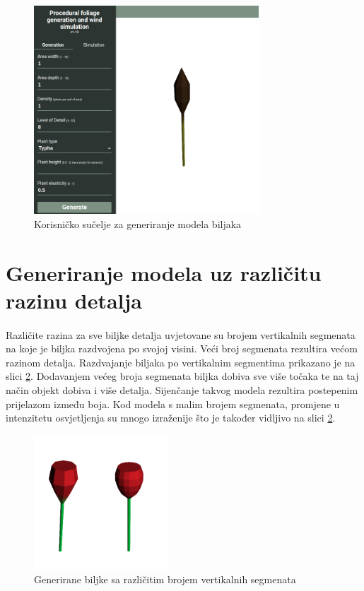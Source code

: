 \documentclass[times, utf8, diplomski]{fer}
\begin{document}
\begin{figure}[h]
	\centering
	\includegraphics[width=0.75\textwidth]{img/22-4}
	\caption{Korisničko sučelje za generiranje modela biljaka}
	\label{fig:22-4}
\end{figure}

\section{Generiranje modela uz različitu razinu detalja}
\paragraph{}
Različite razina za sve biljke detalja uvjetovane su brojem vertikalnih segmenata na koje je 
biljka razdvojena po svojoj visini. Veći broj segmenata rezultira većom razinom detalja. 
Razdvajanje biljaka po vertikalnim segmentima prikazano je na slici \ref{fig:221-1}. 
Dodavanjem većeg broja segmenata biljka dobiva sve više točaka te na taj način objekt dobiva 
i više detalja. Sijenčanje takvog modela rezultira postepenim prijelazom između boja. Kod 
modela s malim brojem segmenata, promjene u intenzitetu osvjetljenja su mnogo izraženije što 
je također vidljivo na slici \ref{fig:221-1}.

\begin{figure}[h]
	\centering
	\includegraphics[width=0.45\textwidth]{img/221-1}
	\caption{Generirane biljke sa različitim brojem vertikalnih segmenata}
	\label{fig:221-1}
\end{figure}
\end{document}
